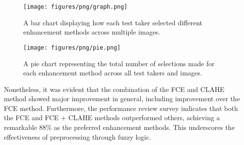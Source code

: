 \begin{figure}[h]
    \centering
    \texttt{[image: figures/png/graph.png]}
    \caption{A bar chart displaying how each test taker selected different enhancement methods across multiple images.}
    \label{fig:graph}
\end{figure}


\begin{figure}[h]
    \centering
    \texttt{[image: figures/png/pie.png]}
    \caption{A pie chart representing the total number of selections made for each enhancement method across all test takers and images.}
    \label{fig:pie}
\end{figure}

Nonetheless, it was evident that the combination of the FCE and CLAHE method showed major improvement in general, including improvement over the FCE method. Furthermore, the performance review survey indicates that both the FCE and FCE + CLAHE methods outperformed others, achieving a remarkable 88\% as the preferred enhancement methods. This underscores the effectiveness of preprocessing through fuzzy logic.